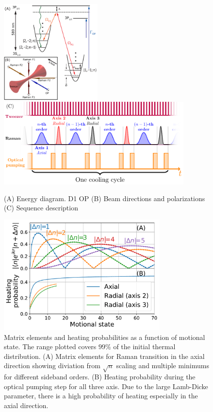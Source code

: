 \documentclass[aps,prl,twocolumn,groupedaddress]{revtex4-1}
\begin{document}
\begin{figure}
  \includegraphics[height=5.2cm]{imgs/Na_RSC_schematic.pdf}
  \includegraphics[height=4.5cm]{sequence.pdf}
  \caption{(A) Energy diagram. D1 OP
    (B) Beam directions and polarizations
    (C) Sequence description
    \label{f-setup}}
\end{figure}
\begin{figure}[b]
  \includegraphics[width=8.5cm]{imgs/fig2_raman_op.pdf}
  \caption{Matrix elements and heating probabilities as a function of motional state.
    The range plotted covers $99\%$ of the initial thermal distribution.
    (A) Matrix elements for Raman transition in the axial direction showing diviation from
    $\sqrt{n}$ scaling and multiple minimums for different sideband orders.
    (B) Heating probability during the optical pumping step for all three axis.
    Due to the large Lamb-Dicke parameter,
    there is a high probability of heating especially in the axial direction.
    \label{f-ld}}
\end{figure}
\end{document}
